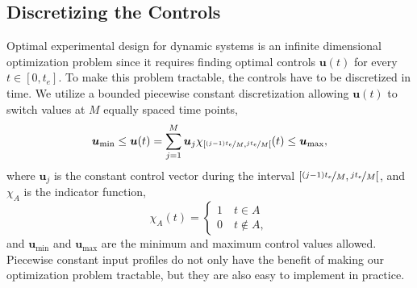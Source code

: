\subsection{Discretizing the Controls}
Optimal experimental design for dynamic systems is an infinite dimensional optimization problem since it requires finding optimal controls $\bm u(t)$ for every $t \in [0,t_e]$. To make this problem tractable, the controls have to be discretized in time. We utilize a bounded piecewise constant discretization allowing $\bm u(t)$ to switch values at $M$ equally spaced time points,
\begin{equation}
\bm u_{\min} \leq \bm u(t) = \sum_{j=1}^M \bm u_j \chi_{\left [\nicefrac{(j-1)t_e}{M},\nicefrac{jt_e}{M}\right [ }(t) \leq \bm u_{\max},
\label{input}
\end{equation}
where $\bm u_j$ is the constant control vector during the interval
$\left [\nicefrac{(j-1)t_e}{M},\nicefrac{jt_e}{M}\right [$, and $\chi_A$
is the indicator function,
\begin{equation}
\chi_A(t) =
\begin{cases} 1 \quad t\in A \\ 0 \quad t\not\in A, \end{cases}
\end{equation}
and $\bm u_{\min}$ and $\bm u_{\max}$ are the minimum and maximum control values allowed. Piecewise constant input profiles do not only have the benefit of making our optimization problem tractable, but they are also easy to implement in practice.
